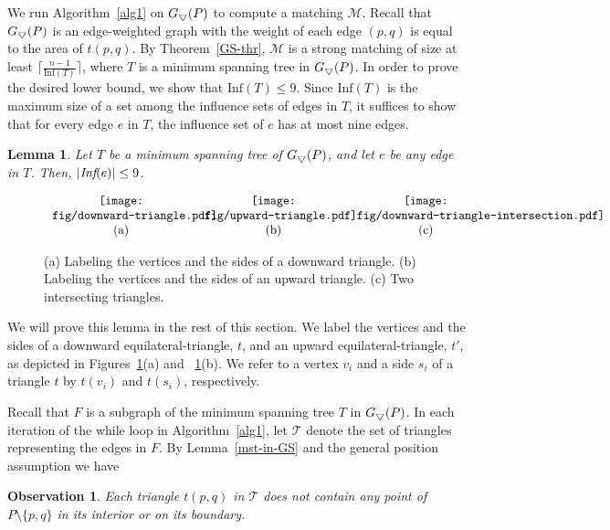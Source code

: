 \documentclass[11pt,a4paper]{article}
\newcommand{\G}[2]{G_{#1}({#2})}
\newcommand{\Inf}[1]{\text{Inf}(#1)}
\newcommand{\trids}{\scriptsize\bigtriangledown}
\newtheorem{lemma}{Lemma}
\newtheorem{observation}{Observation}
\begin{document}
We run Algorithm~\ref{alg1} on $\G{\trids}{P}$ to compute a matching $\mathcal{M}$. Recall that $\G{\trids}{P}$ is an edge-weighted graph with the weight of each edge $(p,q)$ is equal to the area of $t(p,q)$. By Theorem~\ref{GS-thr}, $\mathcal{M}$ is a strong matching of size at least $\lceil\frac{n-1}{\Inf{T}}\rceil$, where $T$ is a minimum spanning tree in $\G{\trids}{P}$. In order to prove the desired lower bound, we show that $\Inf{T}\le 9$. Since $\Inf{T}$ is the maximum size of a set among the
influence sets of edges in $T$, it suffices to show that for every edge $e$ in $T$, the influence set of $e$ has at most nine edges. 
\begin{lemma}
\label{triangle-inf-lemma}
Let $T$ be a minimum spanning tree of $\G{\trids}{P}$, and let $e$ be any edge in $T$. Then, $|\emph{Inf}(e)|\le 9$.
\end{lemma}
  

 \begin{figure}[htb]
  \centering
\setlength{\tabcolsep}{0in}
  $\begin{tabular}{ccc}
\multicolumn{1}{m{.33\columnwidth}}{\centering\texttt{[image: fig/downward-triangle.pdf]}}
&\multicolumn{1}{m{.33\columnwidth}}{\centering\texttt{[image: fig/upward-triangle.pdf]}} 
&\multicolumn{1}{m{.33\columnwidth}}{\centering\texttt{[image: fig/downward-triangle-intersection.pdf]}}\\
(a)&(b)&(c)
\end{tabular}$
  \caption{(a) Labeling the vertices and the sides of a downward triangle. (b) Labeling the vertices and the sides of an upward triangle. (c) Two intersecting triangles.}
  \label{triangle-fig}
\end{figure}

We will prove this lemma in the rest of this section. We label the vertices and the sides of a downward equilateral-triangle, $t$, and an upward equilateral-triangle, $t'$, as depicted in Figures~\ref{triangle-fig}(a) and ~\ref{triangle-fig}(b). We refer to a vertex $v_i$ and a side $s_i$ of a triangle $t$ by $t(v_i)$ and $t(s_i)$, respectively.

Recall that $F$ is a subgraph of the minimum spanning tree $T$ in $\G{\trids}{P}$. In each iteration of the {\sf while} loop in Algorithm~\ref{alg1}, let $\mathcal{T}$ denote the set of triangles representing the edges in $F$. By Lemma~\ref{mst-in-GS} and the general position assumption we have

\begin{observation}
\label{no-point-in-triangle-obs}
Each triangle $t(p,q)$ in $\mathcal{T}$ does not contain any point of $P\setminus \{p,q\}$ in its interior or on its boundary.\vspace{-5pt}
\end{observation}
\end{document}
